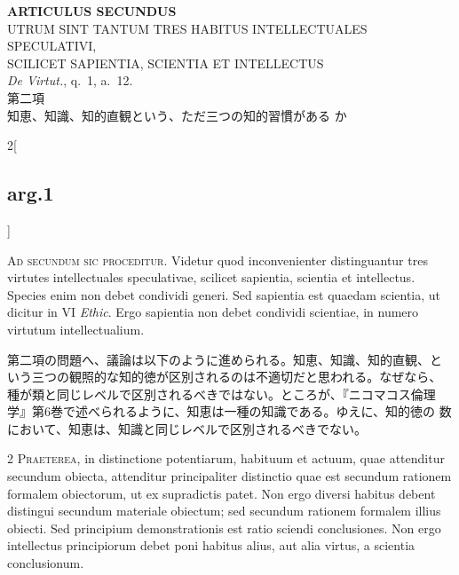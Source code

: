 \documentclass[paper=a4paper,fontsize=10pt,jafontsize=9pt,titlepage]{jlreq}
\begin{document}
{}
\setcounter{section}{2}
\setcounter{subsection}{0}
\begin{center}
 {\Large {\bfseries ARTICULUS SECUNDUS}}\\ {\large UTRUM SINT TANTUM TRES
 HABITUS INTELLECTUALES SPECULATIVI,\\SCILICET SAPIENTIA, SCIENTIA ET
 INTELLECTUS}\\ {\footnotesize {\itshape De Virtut.}, q.~1, a.~12.}\\
 {\Large 第二項\\知恵、知識、知的直観という、ただ三つの知的習慣がある
 か}
\end{center}

\begin{paracol}{2}[\subsection{arg.1}]

{\huge A}{\scshape d secundum sic proceditur}. Videtur quod
 inconvenienter distinguantur tres virtutes intellectuales
 speculativae, scilicet sapientia, scientia et intellectus. Species
 enim non debet condividi generi. Sed sapientia est quaedam scientia,
 ut dicitur in VI {\itshape Ethic}. Ergo sapientia non debet condividi
 scientiae, in numero virtutum intellectualium.

\switchcolumn

第二項の問題へ、議論は以下のように進められる。知恵、知識、知的直観、と
いう三つの観照的な知的徳が区別されるのは不適切だと思われる。なぜなら、
種が類と同じレベルで区別されるべきではない。ところが、『ニコマコス倫理
学』第6巻で述べられるように、知恵は一種の知識である。ゆえに、知的徳の
数において、知恵は、知識と同じレベルで区別されるべきでない。


{\scshape 2 Praeterea}, in distinctione potentiarum, habituum et
actuum, quae attenditur secundum obiecta, attenditur principaliter
distinctio quae est secundum rationem formalem obiectorum, ut ex
supradictis patet. Non ergo diversi habitus debent distingui secundum
materiale obiectum; sed secundum rationem formalem illius obiecti. Sed
principium demonstrationis est ratio sciendi conclusiones. Non ergo
intellectus principiorum debet poni habitus alius, aut alia virtus, a
scientia conclusionum.


\end{paracol}
\end{document}
